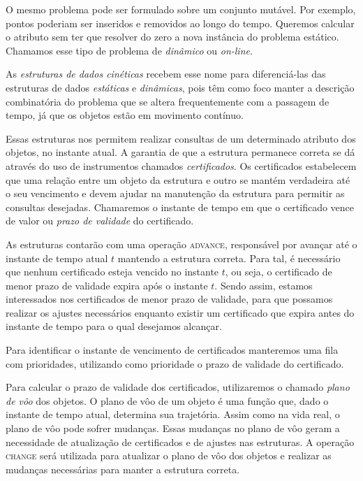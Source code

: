 O mesmo problema pode ser formulado sobre um conjunto mutável.
Por exemplo, pontos poderiam ser inseridos e removidos ao longo do tempo.
Queremos calcular o atributo sem ter que resolver do zero a nova instância do problema estático.
Chamamos esse tipo de problema de \textit{dinâmico} ou \textit{on-line}.

As \emph{estruturas de dados cinéticas} recebem esse nome para diferenciá-las
das estruturas de dados \textit{estáticas} e \textit{dinâmicas}, pois têm como
foco manter a descrição combinatória do problema que se altera frequentemente
com a passagem de tempo, já que os objetos estão em movimento contínuo.

Essas estruturas nos permitem realizar consultas de um determinado atributo dos
objetos, no instante atual.
A garantia de que a estrutura permanece correta se dá através do uso de instrumentos chamados \textit{certificados}.
Os certificados estabelecem que uma relação entre um objeto da estrutura e outro se
mantém verdadeira até o seu vencimento e devem ajudar na manutenção da estrutura
para permitir as consultas desejadas.
Chamaremos o instante de tempo em que o certificado vence de valor ou
\textit{prazo de validade} do certificado.

As estruturas contarão com uma operação \textsc{advance}, responsável por
avançar até o instante de tempo atual $t$ mantendo a estrutura correta.
Para tal, é necessário que nenhum certificado esteja vencido no instante $t$, ou seja, o
certificado de menor prazo de validade expira após o instante $t$.
Sendo assim, estamos interessados nos certificados de menor prazo de validade, para que
possamos realizar os ajustes necessários enquanto existir um certificado que
expira antes do instante de tempo para o qual desejamos alcançar.

Para identificar o instante de vencimento de certificados manteremos uma fila
com prioridades, utilizando como prioridade o prazo de validade do certificado.

Para calcular o prazo de validade dos certificados, utilizaremos o chamado
\textit{plano de vôo} dos objetos.
O plano de vôo de um objeto é uma função que, dado o instante de tempo atual, determina sua trajetória.
Assim como na vida real, o plano de vôo pode sofrer mudanças.
Essas mudanças no plano de vôo geram a necessidade de atualização de certificados
e de ajustes nas estruturas.
A operação \textsc{change} será utilizada para atualizar o plano de vôo dos
objetos e realizar as mudanças necessárias para manter a estrutura correta.

